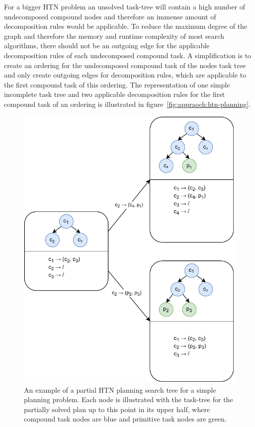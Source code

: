 For a bigger HTN problem an unsolved task-tree will contain a high number of undecomposed compound nodes and therefore an immense amount of decomposition rules would be applicable.
To reduce the maximum degree of the graph and therefore the memory and runtime complexity of most search algorithms, there should not be an outgoing edge for the applicable decomposition rules of each undecomposed compound task.
A simplification is to create an ordering for the undecomposed compound task of the nodes task tree and only create outgoing edges for decomposition rules, which are applicable to the first compound task of this ordering.
The representation of one simple incomplete task tree and two applicable decomposition rules for the first compound task of an ordering is illustrated in figure~\ref{fig:appraoch:htn-planning}.
\begin{figure}[ht!]
    \centering
    \includegraphics[height=0.5\textheight]{gfx/Figures/Approach/HTN.pdf}
    \caption{An example of a partial HTN planning search tree for a simple planning problem.
    Each node is illustrated with the task-tree for the partially solved plan up to this point in its upper half, where compound task nodes are blue and primitive task nodes are green.
}
\end{figure}
